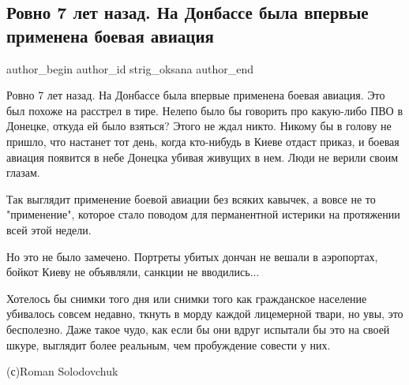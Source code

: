  
 
 
 
 
 
\subsection{Ровно 7 лет назад. На Донбассе была впервые применена боевая авиация}
\label{sec:27_05_2021.fb.strig_oksana.1.vojna_donbass_aviacia}
 
\ifcmt
 author_begin
   author_id strig_oksana
 author_end
\fi

Ровно 7 лет назад. На Донбассе была впервые применена боевая авиация. Это был
похоже на расстрел в тире. Нелепо было бы говорить про какую-либо ПВО в
Донецке, откуда ей было взяться? Этого не ждал никто. Никому бы в голову не
пришло, что настанет тот день, когда кто-нибудь в Киеве отдаст приказ, и боевая
авиация появится в небе Донецка убивая живущих в нем. Люди не верили своим
глазам. 

Так выглядит применение боевой авиации без всяких кавычек, а вовсе не то
"применение", которое стало поводом для перманентной истерики на протяжении
всей этой недели. 

Но это не было замечено. Портреты убитых дончан не вешали в аэропортах, бойкот
Киеву не объявляли, санкции не вводились... 

Хотелось бы снимки того дня или снимки того как гражданское население убивалось
совсем недавно, ткнуть в морду каждой лицемерной твари, но увы, это бесполезно.
Даже такое чудо, как если бы они вдруг испытали бы это на своей шкуре, выглядит
более реальным, чем пробуждение совести у них.

(с)Roman Solodovchuk
